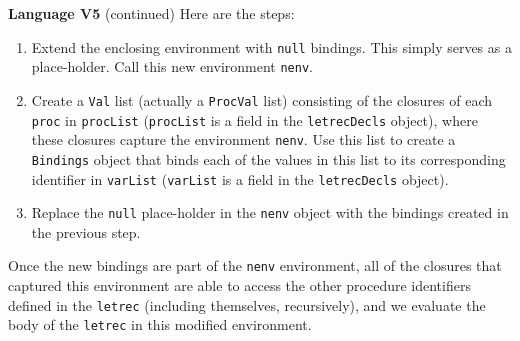 \begin{minipage}[t]{\sw}
\slidenumber
\LARGE
{\bf Language V5} (continued)\exx
Here are the steps:
\begin{enumerate}
\item
  Extend the enclosing environment with \verb'null' bindings.
  This simply serves as a place-holder.
  Call this new environment \verb'nenv'.
\item
  Create a \verb'Val' list (actually a \verb'ProcVal' list)
  consisting of the closures of each \verb'proc' in \verb'procList'
  (\verb'procList' is a field in the \verb'letrecDecls' object),
  where these closures capture the environment \verb'nenv'.
  Use this list to create a \verb'Bindings' object
  that binds each of the values in this list
  to its corresponding identifier in \verb'varList'
  (\verb'varList' is a field in the \verb'letrecDecls' object).
\item
  Replace the \verb'null' place-holder in the \verb'nenv' object
  with the bindings created in the previous step.
\end{enumerate}
Once the new bindings are part of the \verb'nenv' environment,
all of the closures that captured this environment
are able to access the other procedure identifiers defined
in the \verb'letrec' (including themselves, recursively),
and we evaluate the body of the \verb'letrec'
in this modified environment.
\end{minipage}
